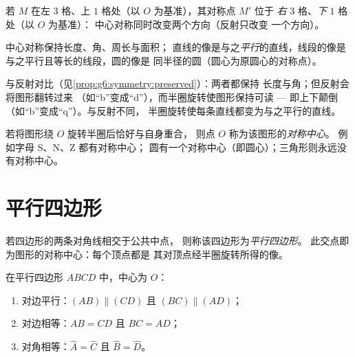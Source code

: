 \begin{example}[在方格纸上]\label{ex:g7:central:grid}
若 $M$ 在左 $3$ 格、上 $1$ 格处（以 $O$ 为基准），其对称点
$M'$ 位于 \emph{右} $3$ 格、\emph{下} $1$ 格处（以 $O$ 为基准）：
中心对称同时改变两个方向（反射只改变
一个方向）。
\end{example}

\begin{proposition}[半圈旋转保持的性质]\label{prop:g7:central:preserved}
中心对称保持长度、角、周长与面积；
直线的像是与之\emph{平行}的直线，线段的像是
与之平行且等长的线段，圆的像是
同半径的圆（圆心为原圆心的对称点）。
\end{proposition}
\admitted

\begin{remark}
与反射对比（见\cref{prop:g6:symmetry:preserved}）：两者都保持
长度与角；但反射会将图形翻转过来
（如“b”变成“d”），而半圈旋转使图形保持可读 ---
即上下颠倒（如“b”变成“q”）。与反射不同，
半圈旋转使每条直线都变为与之平行的直线。
\end{remark}

\begin{definition}[对称中心]\label{def:g7:central:center}
若将图形绕 $O$ 旋转半圈后恰好与自身重合，
则点 $O$ 称为该图形的\emph{对称中心}。
例如字母 S、N、Z 都有对称中心；
圆有一个对称中心（即圆心）；三角形则永远没有对称中心。
\end{definition}

\section{平行四边形}

\begin{definition}[平行四边形]\label{def:g7:central:parallelogram}
若四边形的两条对角线相交于公共中点，
则称该四边形为\emph{平行四边形}。
此交点即为图形的对称中心：每个顶点都是
其对顶点经半圈旋转所得的像。
\end{definition}

\begin{theorem}[平行四边形的性质]\label{thm:g7:central:properties}
在平行四边形 $ABCD$ 中，中心为 $O$：
\begin{enumerate}
  \item 对边平行：$(AB) \parallel (CD)$ 且
        $(BC) \parallel (AD)$；
  \item 对边相等：$AB = CD$ 且
        $BC = AD$；
  \item 对角相等：$\widehat A = \widehat C$ 且
        $\widehat B = \widehat D$。
\end{enumerate}
\end{theorem}

